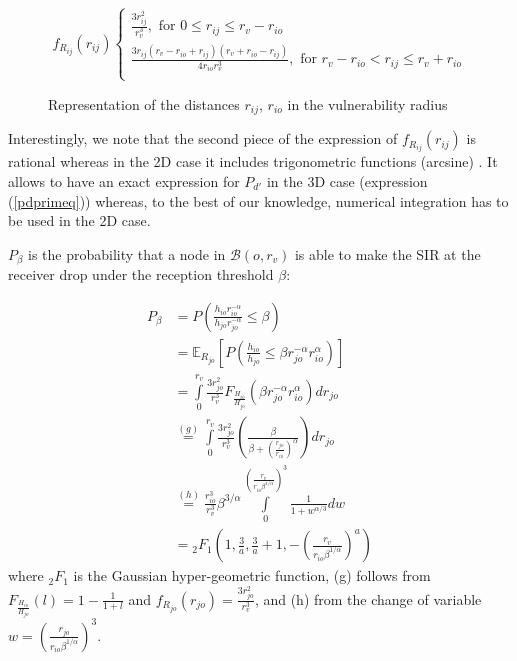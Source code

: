 \documentclass{sig-alternate-05-2015}
\begin{document}
\begin{equation}
   f_{R_{ij}}(r_{ij}) 
   \begin{cases} 
      \frac{3 r_{ij}^2}{r_v^3}, \text{ for } 0\leq r_{ij} \leq r_v - r_{io} \\
      \frac{3r_{ij}\left( r_v-r_{io}+r_{ij}\right) \left( r_v+r_{io}-r_{ij}\right) }{4 r_{io} r_v^3},\text{ for } r_v - r_{io} < r_{ij} \leq r_v+r_{io}\\
      
   \end{cases}
\end{equation}

\begin{figure*}[ht]
        \centering
        \caption{Representation of the distances $r_{ij}$, $r_{io}$ in the vulnerability radius}
        \label{spherefig}
       
\end{figure*}

Interestingly, we note that the second piece of the expression of $f_{R_{ij}}(r_{ij})$ is rational whereas in the 2D case it includes trigonometric functions (arcsine) \cite{elsawy13}. It allows to have an exact expression for $P_{d'}$ in the 3D case (expression (\ref{pdprimeq})) whereas, to the best of our knowledge, numerical integration has to be used in the 2D case.

$P_{\beta}$ is the probability that a node in $\mathcal{B}(o,r_v)$ is able to make the SIR at the receiver drop under the reception threshold $\beta$:

\begin{align}
 P_{\beta}&=P\left( \frac{h_{io} r_{io}^{-\alpha}}{h_{jo} r_{jo}^{-\alpha}}\leq \beta\right) \nonumber\\
 &=\mathbb{E}_{R_{jo}}\left[P\left(\frac{h_{io}}{h_{jo}} \leq \beta r_{jo}^{-\alpha} r_{io}^{\alpha} \right)\right] \nonumber\\
 &=\int \limits_{0}^{r_v} \frac{3 r_{jo}^2}{r_v^3} F_{\frac{H_{io}}{H_{jo}}}( \beta r_{jo}^{-\alpha} r_{io}^{\alpha}) dr_{jo} \nonumber\\
 &\stackrel{(g)}{=} \int \limits_{0}^{r_v} \frac{3 r_{jo}^2}{r_v^3}  \left(\frac{\beta}{\beta+\left(\frac{r_{jo}}{r_{io}}\right)^{\alpha}} \right)dr_{jo} \nonumber\\
 &\stackrel{(h)}{=} \frac{r_{io}^3}{r_v^3} \beta^{3/\alpha} \int \limits_{0}^{\left(\frac{r_v}{r_{io}\beta^{1/\alpha}}\right)^3} \frac{1}{1+w^{\alpha/3}} dw \nonumber\\
 & = {}_2F_1(1,\frac{3}{a},\frac{3}{a}+1,-{\left(\frac{r_v}{r_{io}\beta^{1/\alpha}}\right)}^{a})
\end{align}
where ${}_2F_1$ is the Gaussian hyper-geometric function, (g) follows from $F_{\frac{H_{io}}{H_{jo}}}(l)=1-\frac{1}{1+l}$ and $f_{R_{jo}}(r_{jo})=\frac{3 r_{jo}^2}{r_v^3}$, and (h) from the change of variable $w=\left(\frac{r_{jo}}{r_{io}\beta^{1/\alpha}}\right)^3$.
\end{document}
